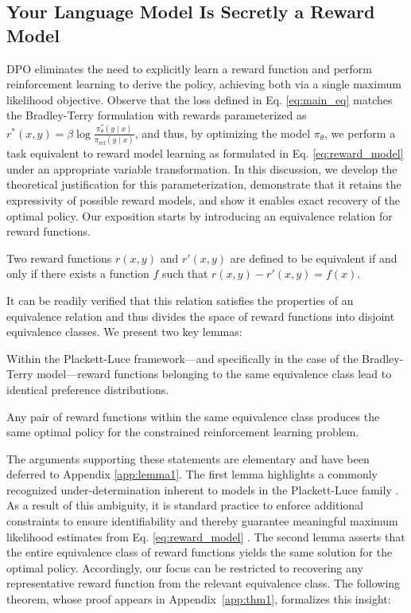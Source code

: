 \label{sec:theory}

\subsection{Your Language Model Is Secretly a Reward Model} DPO eliminates the need to explicitly learn a reward function and perform reinforcement learning to derive the policy, achieving both via a single maximum likelihood objective. Observe that the loss defined in Eq. \ref{eq:main_eq} matches the Bradley-Terry formulation with rewards parameterized as $r^*(x, y) = \beta \log\frac{\pi^*_\theta(y \mid x)}{\pi_\text{ref}(y \mid x)}$, and thus, by optimizing the model $\pi_{\theta}$, we perform a task equivalent to reward model learning as formulated in Eq. \ref{eq:reward_model} under an appropriate variable transformation. In this discussion, we develop the theoretical justification for this parameterization, demonstrate that it retains the expressivity of possible reward models, and show it enables exact recovery of the optimal policy. Our exposition starts by introducing an equivalence relation for reward functions.

\begin{definition}
Two reward functions $r(x, y)$ and $r'(x, y)$ are defined to be equivalent if and only if there exists a function $f$ such that ${r(x, y)-r'(x, y) = f(x)}$.     
\end{definition}

It can be readily verified that this relation satisfies the properties of an equivalence relation and thus divides the space of reward functions into disjoint equivalence classes. We present two key lemmas:

\begin{lemma}\label{lemma:same_prefrence} Within the Plackett-Luce framework—and specifically in the case of the Bradley-Terry model—reward functions belonging to the same equivalence class lead to identical preference distributions.
\end{lemma}

\begin{lemma}\label{lemma:same_policy}
    Any pair of reward functions within the same equivalence class produces the same optimal policy for the constrained reinforcement learning problem.
\end{lemma}

The arguments supporting these statements are elementary and have been deferred to Appendix \ref{app:lemma1}. The first lemma highlights a commonly recognized under-determination inherent to models in the Plackett-Luce family \cite{plackett1975analysis}. As a result of this ambiguity, it is standard practice to enforce additional constraints to ensure identifiability and thereby guarantee meaningful maximum likelihood estimates from Eq. \ref{eq:reward_model} \cite{bong2022generalized}. The second lemma asserts that the entire equivalence class of reward functions yields the same solution for the optimal policy. Accordingly, our focus can be restricted to recovering any representative reward function from the relevant equivalence class. The following theorem, whose proof appears in Appendix~\ref{app:thm1}, formalizes this insight:


